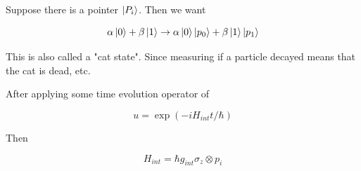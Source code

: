 \documentclass{article}
\newtheorem{one minute paper}[theorem]{One Minute Paper}
\begin{document}
Suppose there is a pointer $\ket{P_i}$. Then we want 

\begin{equation}
    \alpha\ket{0} + \beta\ket{1} \rightarrow \alpha\ket{0}\ket{p_0} + \beta\ket{1}\ket{p_1}
\end{equation}

This is also called a "cat state". Since measuring if a particle decayed means that the cat is dead, etc. 

After applying some time evolution operator of 

$$u = \exp(-i H_{int}t/\hbar)$$

Then 

\begin{equation}
    H_{int} = \hbar g_{int}\sigma_z \otimes p_i
\end{equation}
\end{document}
